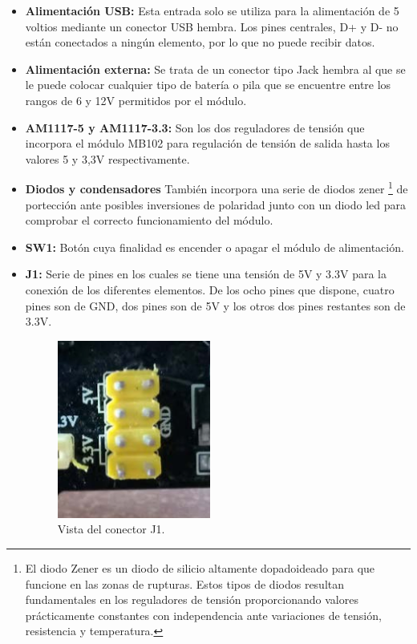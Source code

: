 \begin{itemize}
 \item \textbf{Alimentación USB:} Esta entrada solo se utiliza para la alimentación de 5 voltios mediante un conector USB hembra.
 Los pines centrales, D+ y D- no están conectados a ningún elemento, por lo que no puede recibir datos.

 \item \textbf{Alimentación externa:} Se trata de un conector tipo Jack hembra al que se le puede colocar cualquier tipo de batería
 o pila que se encuentre entre los rangos de 6 y 12V permitidos por el módulo.
 
 \item \textbf{AM1117-5 y AM1117-3.3:} Son los dos reguladores de tensión que incorpora el módulo MB102 para regulación de tensión de salida hasta los valores 
 5 y 3,3V respectivamente.
 
 \item \textbf{ Diodos y condensadores} También incorpora una serie de diodos zener \footnote{El diodo Zener es un diodo de silicio altamente dopado​ ideado para que funcione en las zonas de rupturas. Estos tipos de diodos
 resultan fundamentales en los reguladores de tensión proporcionando valores prácticamente constantes con independencia ante variaciones de tensión, resistencia y temperatura. } 
 de portección ante posibles inversiones de polaridad junto con un diodo led para comprobar el correcto funcionamiento del módulo.
 
 \item \textbf{SW1:} Botón cuya finalidad es encender o apagar el módulo de alimentación.
 
 \item \textbf{J1:} Serie de pines en los cuales se tiene una tensión de 5V y 3.3V para la conexión de los diferentes elementos. De los ocho pines que dispone, cuatro pines son
 de GND, dos pines son de 5V y los otros dos pines restantes son de 3.3V.
 
 \begin{figure}[H]
  \begin{center}
    \includegraphics[scale=0.5]{imagenes/usb_board_pines.png}
  \end{center}
  \caption{Vista del conector J1.}
  \label{figura:conector_usb_board_j1}
\end{figure}


\end{itemize}
